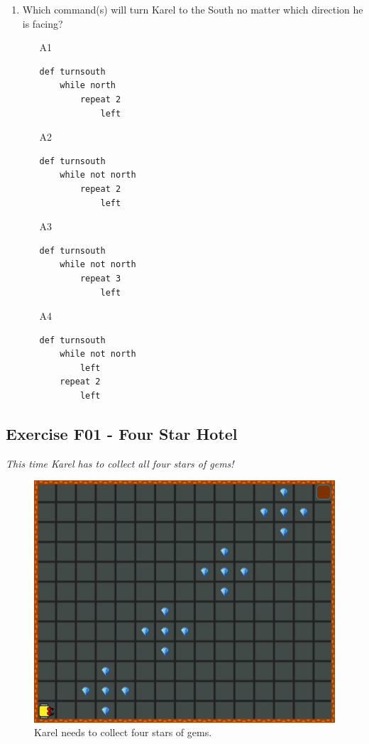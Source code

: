 {{{{\begin{enumerate}
\begin{enumerate}
\item[A3] 
\begin{verbatim}
def emptybag
    while empty
        put
\end{verbatim}
\item[A4] 
\begin{verbatim}
def emptybag
    while not empty
        put
\end{verbatim}
\end{enumerate}
\item Which command(s) will turn Karel to the South no matter 
      which direction he is facing?
\begin{enumerate}
\item[A1] 
\begin{verbatim}
def turnsouth
    while north
        repeat 2
            left
\end{verbatim}
\item[A2] 
\begin{verbatim}
def turnsouth
    while not north
        repeat 2
            left
\end{verbatim}
\item[A3] 
\begin{verbatim}
def turnsouth
    while not north
        repeat 3
            left
\end{verbatim}
\item[A4] 
\begin{verbatim}
def turnsouth
    while not north
        left
    repeat 2
        left
\end{verbatim}
\end{enumerate}
\end{enumerate}

\newpage
\subsection{Exercise F01 - Four Star Hotel}

{\em This time Karel has to collect all four stars of gems!}

\begin{figure}[!ht]
\begin{center}
\includegraphics[height=0.4\textwidth]{imgk/f01.png}
\end{center}
\vspace{-4mm}
\caption{Karel needs to collect four stars of gems.}
\label{fig:f01}
\vspace{-10mm}
\end{figure}
\noindent

}}}}
